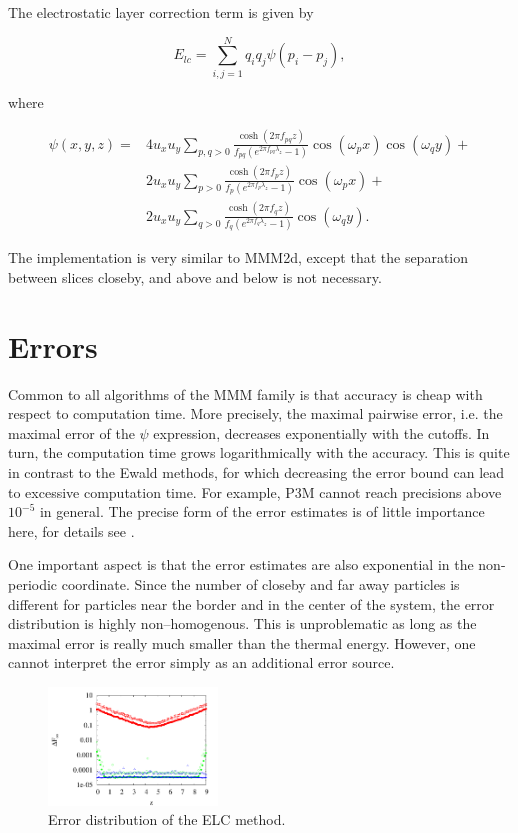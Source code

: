 The electrostatic layer correction term is given by

\[ E_{lc}=\sum_{i,j=1}^Nq_iq_j\psi(p_i-p_j), \]

where

\[ \begin{array}{rl} \psi(x,y,z)=&4u_xu_y\sum_{p,q>0}\frac{\cosh(2\pi
    f_{pq}z)}{f_{pq}(e^{2\pi f_{pq}\lambda_z} - 1)} \cos(\omega_p
  x)\cos(\omega_q y) + \\ &2u_xu_y\sum_{p>0}\frac{\cosh(2\pi f_p
    z)}{f_p(e^{2\pi f_p\lambda_z} - 1)}\cos(\omega_p x)+\\
  &2u_xu_y\sum_{q>0}\frac{\cosh(2\pi f_q z)}{f_q(e^{2\pi f_q\lambda_z}
    - 1)}\cos(\omega_q y). \end{array} \]

The implementation is very similar to MMM2d, except that the
separation between slices closeby, and above and below is not
necessary.

\section{Errors}


Common to all algorithms of the MMM family is that accuracy is cheap
with respect to computation time. More precisely, the maximal pairwise
error, i.e. the maximal error of the $\psi$ expression, decreases
exponentially with the cutoffs. In turn, the computation time grows
logarithmically with the accuracy. This is quite in contrast to the
Ewald methods, for which decreasing the error bound can lead to
excessive computation time. For example, P3M cannot reach precisions
above $10^{-5}$ in general. The precise form of the error estimates is
of little importance here, for details see \citet{arnold02c,arnold02d}.

One important aspect is that the error estimates are also exponential
in the non-periodic coordinate. Since the number of closeby and far
away particles is different for particles near the border and in the
center of the system, the error distribution is highly
non--homogenous. This is unproblematic as long as the maximal error is
really much smaller than the thermal energy. However, one cannot
interpret the error simply as an additional error source.

\begin{figure}[ht]
  \centering
  \includegraphics[width=0.4\textwidth]{figures/elc-errordist}
  \caption{Error distribution of the ELC method.}
  \label{fig:ELC-error}
\end{figure}

